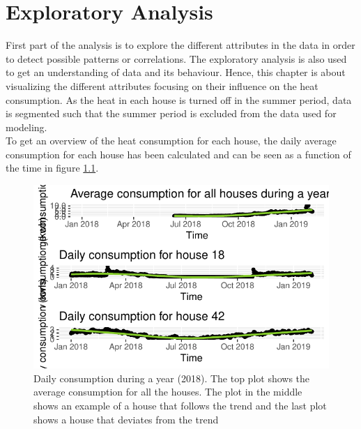 \chapter{Exploratory Analysis}
First part of the analysis is to explore the different attributes in the data in order to detect possible patterns or correlations. The exploratory analysis is also used to get an understanding of data and its behaviour. Hence, this chapter is about visualizing the different attributes focusing on their influence on the heat consumption. As the heat in each house is turned off in the summer period, data is segmented such that the summer period is excluded from the data used for modeling. \\

\noindent To get an overview of the heat consumption for each house, the daily average consumption for each house has been calculated and can be seen as a function of the time in figure \ref{fig: daily_cons}. 

\begin{figure}
    \centering
    \includegraphics[width=.75\textwidth]{../../../figures/daily_cons.pdf}
    \caption{Daily consumption during a year (2018). The top plot shows the average consumption for all the houses. The plot in the middle shows an example of a house that follows the trend and the last plot shows a house that deviates from the trend}
    \label{fig: daily_cons}
\end{figure}

